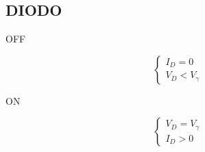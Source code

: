 \documentclass{article}
\begin{document}
\subsection*{DIODO}

\begin{minipage}{0.2\textwidth}
\end{minipage}
\begin{minipage}{0.8\textwidth}
    \begin{minipage}{0.5\linewidth}
        \begin{center}
            OFF
        \end{center}
        \[
            \begin{cases}
                I_D = 0\\
                V_D < V_\gamma
            \end{cases}
        \]
    \end{minipage}
    \begin{minipage}{0.5\linewidth}
        \begin{center}
            ON
        \end{center}
        \[
            \begin{cases}
                V_D = V_\gamma \\
                I_D > 0
            \end{cases}
        \]
    \end{minipage}
\end{minipage}
\end{document}
